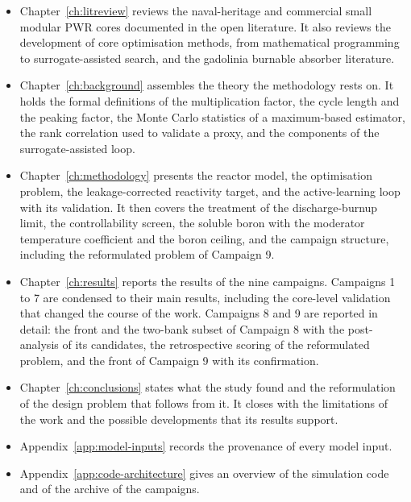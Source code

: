 \begin{itemize}
  \item Chapter~\ref{ch:litreview} reviews the naval-heritage and
        commercial small modular PWR cores documented in the open
        literature. It also reviews the development of core
        optimisation methods, from mathematical programming to
        surrogate-assisted search, and the gadolinia burnable absorber
        literature.

  \item Chapter~\ref{ch:background} assembles the theory the
        methodology rests on. It holds the formal definitions of the
        multiplication factor, the cycle length and the peaking factor,
        the Monte Carlo statistics of a maximum-based estimator, the
        rank correlation used to validate a proxy, and the components
        of the surrogate-assisted loop.

  \item Chapter~\ref{ch:methodology} presents the reactor model, the
        optimisation problem, the leakage-corrected reactivity target,
        and the active-learning loop with its validation. It then
        covers the treatment of the discharge-burnup limit, the
        controllability screen, the soluble boron with the moderator
        temperature coefficient and the boron ceiling, and the campaign
        structure, including the reformulated problem of Campaign 9.

  \item Chapter~\ref{ch:results} reports the results of the nine
        campaigns. Campaigns 1 to 7 are condensed to their main results,
        including the core-level validation that changed the course of
        the work. Campaigns 8 and 9 are reported in detail: the front and
        the two-bank subset of Campaign 8 with the post-analysis of its
        candidates, the retrospective scoring of the reformulated
        problem, and the front of Campaign 9 with its confirmation.

  \item Chapter~\ref{ch:conclusions} states what the study found and
        the reformulation of the design problem that follows from it. It
        closes with the limitations of the work and the possible
        developments that its results support.

  \item Appendix~\ref{app:model-inputs} records the provenance of every
        model input.

  \item Appendix~\ref{app:code-architecture} gives an overview of the
        simulation code and of the archive of the campaigns.
\end{itemize}

